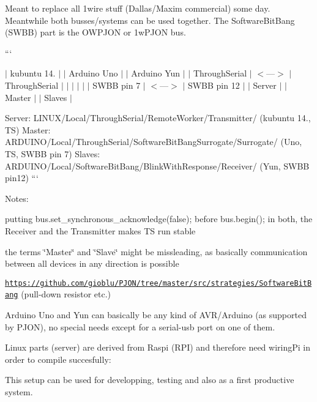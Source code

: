 Meant to replace all 1wire stuff (Dallas/\-Maxim commercial) some day. Meantwhile both busses/systems can be used together. The Software\-Bit\-Bang (S\-W\-B\-B) part is the O\-W\-P\-J\-O\-N or 1w\-P\-J\-O\-N bus.

``` 

 $\vert$ kubuntu 14. $\vert$ $\vert$ Arduino Uno $\vert$ $\vert$ Arduino Yun $\vert$ $\vert$ Through\-Serial $\vert$ $<$---$>$ $\vert$ Through\-Serial $\vert$ $\vert$ $\vert$ $\vert$ $\vert$ $\vert$ S\-W\-B\-B pin 7 $\vert$ $<$---$>$ $\vert$ S\-W\-B\-B pin 12 $\vert$ $\vert$ Server $\vert$ $\vert$ Master $\vert$ $\vert$ Slaves $\vert$ 



Server\-: L\-I\-N\-U\-X/\-Local/\-Through\-Serial/\-Remote\-Worker/\-Transmitter/ (kubuntu 14., T\-S) Master\-: A\-R\-D\-U\-I\-N\-O/\-Local/\-Through\-Serial/\-Software\-Bit\-Bang\-Surrogate/\-Surrogate/ (Uno, T\-S, S\-W\-B\-B pin 7) Slaves\-: A\-R\-D\-U\-I\-N\-O/\-Local/\-Software\-Bit\-Bang/\-Blink\-With\-Response/\-Receiver/ (Yun, S\-W\-B\-B pin12) ```

Notes\-:
\begin{DoxyItemize}
\item putting {\ttfamily bus.\-set\-\_\-synchronous\-\_\-acknowledge(false);} before {\ttfamily bus.\-begin();} in both, the Receiver and the Transmitter makes T\-S run stable
\item the terms \char`\"{}\-Master\char`\"{} and \char`\"{}\-Slave\char`\"{} might be missleading, as basically communication between all devices in any direction is possible
\item \href{https://github.com/gioblu/PJON/tree/master/src/strategies/SoftwareBitBang}{\tt https\-://github.\-com/gioblu/\-P\-J\-O\-N/tree/master/src/strategies/\-Software\-Bit\-Bang} (pull-\/down resistor etc.)
\end{DoxyItemize}

Arduino Uno and Yun can basically be any kind of A\-V\-R/\-Arduino (as supported by P\-J\-O\-N), no special needs except for a serial-\/usb port on one of them.

Linux parts (server) are derived from Raspi (R\-P\-I) and therefore need wiring\-Pi in order to compile succesfully\-: 


This setup can be used for developping, testing and also as a first productive system.

